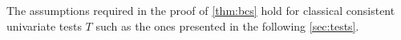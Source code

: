 The assumptions required in the proof of \cref{thm:bcs} hold for classical consistent univariate tests $T$ such as the ones presented in the following \cref{sec:tests}.

































